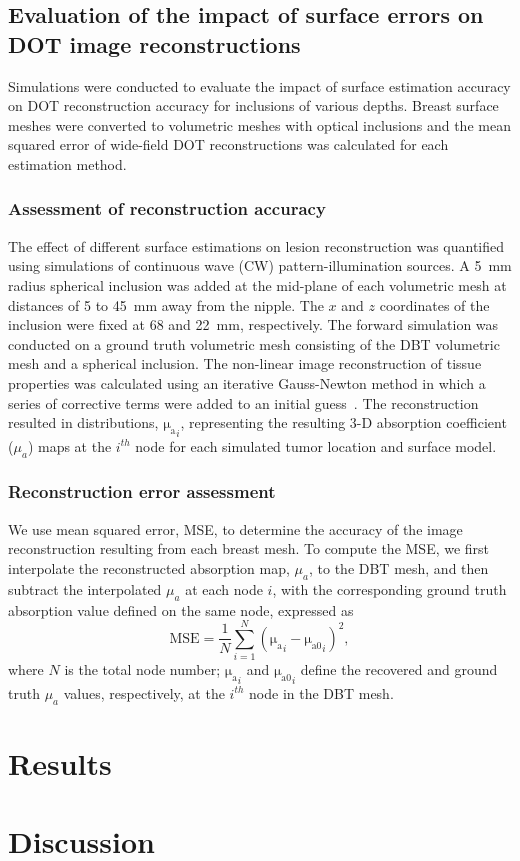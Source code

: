 \subsection{Evaluation of the impact of surface errors on DOT image reconstructions}
Simulations were conducted to evaluate the impact of surface estimation accuracy on DOT reconstruction accuracy for inclusions of various depths. Breast surface meshes were converted to volumetric meshes with optical inclusions and the mean squared error of wide-field DOT reconstructions was calculated for each estimation method. 

\subsubsection{Assessment of reconstruction accuracy}
The effect of different surface estimations on lesion reconstruction was quantified using simulations of continuous wave (CW) pattern-illumination sources. A 5~mm radius spherical inclusion was added at the mid-plane of each volumetric mesh at distances of 5 to 45~mm away from the nipple. The $x$ and $z$ coordinates of the inclusion were fixed at 68 and 22~mm, respectively. The forward simulation was conducted on a ground truth volumetric mesh consisting of the DBT volumetric mesh and a spherical inclusion. The non-linear image reconstruction of tissue properties was calculated using an iterative Gauss-Newton method in which a series of corrective terms were added to an initial guess~\cite{Fang2009}. The reconstruction resulted in distributions, $\mathrm{\mu_{a}}_{i}$, representing the resulting 3-D absorption coefficient ($\mu_a$) maps at the $i^{th}$ node for each simulated tumor location and surface model.

\subsubsection{Reconstruction error assessment}
We use mean squared error, MSE, to determine the accuracy of the image reconstruction resulting from each breast mesh. To compute the MSE, we first interpolate the reconstructed absorption map, $\mu_a$, to the DBT mesh, and then subtract the interpolated $\mu_a$ at each node $i$, with the corresponding ground truth absorption value defined on the same node, expressed as
\begin{equation}
\label{eq:mse}
\mathrm{MSE} = \frac{1}{N}\sum_{i=1}^{N}(\mathrm{\mu_{a}}_{i} - \mathrm{\mu_{a0}}_i)^{2},
\end{equation}
where $N$ is the total node number; $\mathrm{\mu_{a}}_i$ and $\mathrm{\mu_{a0}}_i$ define the recovered and ground truth $\mu_{a}$ values, respectively, at the $i^{th}$ node in the DBT mesh.



\section{Results}
\label{chap:omci:results}



\section{Discussion}
\label{chap:omci:discussion}




